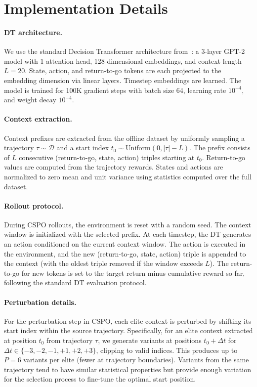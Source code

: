 \documentclass{article}
\newcommand{\cspo}{\textsc{CSPO}}
\newcommand{\cD}{\mathcal{D}}
\begin{document}
\section{Implementation Details}
\label{app:implementation}

\paragraph{DT architecture.} We use the standard Decision Transformer architecture from~\citet{chen2021decision}: a 3-layer GPT-2 model with 1 attention head, 128-dimensional embeddings, and context length $L = 20$. State, action, and return-to-go tokens are each projected to the embedding dimension via linear layers. Timestep embeddings are learned. The model is trained for 100K gradient steps with batch size 64, learning rate $10^{-4}$, and weight decay $10^{-4}$.

\paragraph{Context extraction.} Context prefixes are extracted from the offline dataset by uniformly sampling a trajectory $\tau \sim \cD$ and a start index $t_0 \sim \text{Uniform}(0, |\tau| - L)$. The prefix consists of $L$ consecutive (return-to-go, state, action) triples starting at $t_0$. Return-to-go values are computed from the trajectory rewards. States and actions are normalized to zero mean and unit variance using statistics computed over the full dataset.

\paragraph{Rollout protocol.} During \cspo{} rollouts, the environment is reset with a random seed. The context window is initialized with the selected prefix. At each timestep, the DT generates an action conditioned on the current context window. The action is executed in the environment, and the new (return-to-go, state, action) triple is appended to the context (with the oldest triple removed if the window exceeds $L$). The return-to-go for new tokens is set to the target return minus cumulative reward so far, following the standard DT evaluation protocol.

\paragraph{Perturbation details.} For the perturbation step in \cspo{}, each elite context is perturbed by shifting its start index within the source trajectory. Specifically, for an elite context extracted at position $t_0$ from trajectory $\tau$, we generate variants at positions $t_0 + \Delta t$ for $\Delta t \in \{-3, -2, -1, +1, +2, +3\}$, clipping to valid indices. This produces up to $P = 6$ variants per elite (fewer at trajectory boundaries). Variants from the same trajectory tend to have similar statistical properties but provide enough variation for the selection process to fine-tune the optimal start position.
\end{document}
